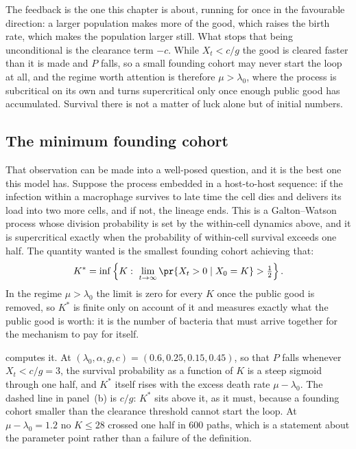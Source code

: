 The feedback is the one this chapter is about, running for once in the
favourable direction: a larger population makes more of the good, which
raises the birth rate, which makes the population larger still. What stops
that being unconditional is the clearance term $-c$. While $X_t<c/g$ the good
is cleared faster than it is made and $P$ falls, so a small founding cohort
may never start the loop at all, and the regime worth attention is therefore
$\mu>\lambda_0$, where the process is subcritical on its own and turns
supercritical only once enough public good has accumulated. Survival there is
not a matter of luck alone but of initial numbers.

\subsection{The minimum founding cohort}
\label{var:sec:kstar}

That observation can be made into a well-posed question, and it is the best
one this model has. Suppose the process embedded in a host-to-host sequence:
if the infection within a macrophage survives to late time the cell dies and
delivers its load into two more cells, and if not, the lineage ends. This is
a Galton--Watson process whose division probability is set by the within-cell
dynamics above, and it is supercritical exactly when the probability of
within-cell survival exceeds one half. The quantity wanted is the smallest
founding cohort achieving that:
\begin{equation}
K^\ast=\inf\left\{K:\ \lim_{t\to\infty}\pr{X_t>0\mid X_0=K}>\tfrac12\right\}.
\label{var:eq:kstar}
\end{equation}
In the regime $\mu>\lambda_0$ the limit is zero for every $K$ once the public
good is removed, so $K^\ast$ is finite only on account of it and measures
exactly what the public good is worth: it is the number of bacteria that must
arrive together for the mechanism to pay for itself.

 computes it. At
$(\lambda_0,\alpha,g,c)=(0.6,0.25,0.15,0.45)$, so that $P$ falls whenever
$X_t<c/g=3$, the survival probability as a function of $K$ is a steep
sigmoid through one half, and $K^\ast$ itself rises with the excess death
rate $\mu-\lambda_0$. The dashed line in panel~(b) is $c/g$: $K^\ast$ sits
above it, as it must, because a founding cohort smaller than the clearance
threshold cannot start the loop. At $\mu-\lambda_0=1.2$ no $K\le 28$ crossed
one half in $600$ paths, which is a statement about the parameter point
rather than a failure of the definition.

